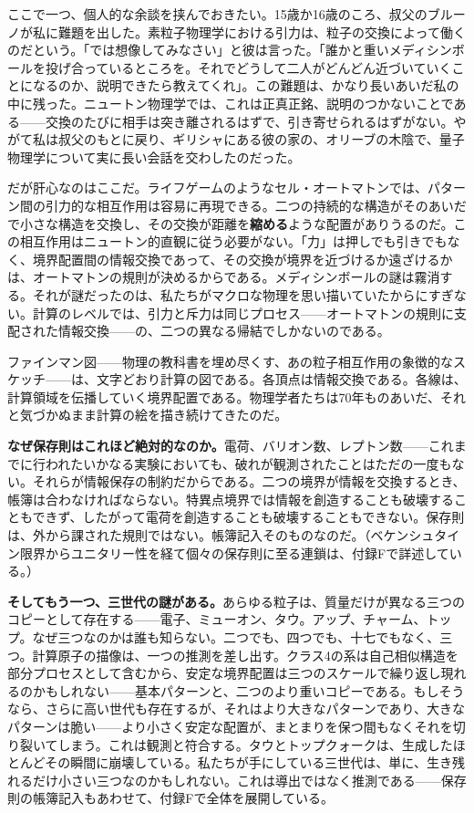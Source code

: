 \documentclass[11pt, twoside, openright]{book}
\begin{document}
ここで一つ、個人的な余談を挟んでおきたい。15歳か16歳のころ、叔父のブルーノが私に難題を出した。素粒子物理学における引力は、粒子の交換によって働くのだという。「では想像してみなさい」と彼は言った。「誰かと重いメディシンボールを投げ合っているところを。それでどうして二人がどんどん近づいていくことになるのか、説明できたら教えてくれ」。この難題は、かなり長いあいだ私の中に残った。ニュートン物理学では、これは正真正銘、説明のつかないことである------交換のたびに相手は突き離されるはずで、引き寄せられるはずがない。やがて私は叔父のもとに戻り、ギリシャにある彼の家の、オリーブの木陰で、量子物理学について実に長い会話を交わしたのだった。

だが肝心なのはここだ。ライフゲームのようなセル・オートマトンでは、パターン間の引力的な相互作用は容易に再現できる。二つの持続的な構造がそのあいだで小さな構造を交換し、その交換が距離を\textbf{縮める}ような配置がありうるのだ。この相互作用はニュートン的直観に従う必要がない。「力」は押しでも引きでもなく、境界配置間の情報交換であって、その交換が境界を近づけるか遠ざけるかは、オートマトンの規則が決めるからである。メディシンボールの謎は霧消する。それが謎だったのは、私たちがマクロな物理を思い描いていたからにすぎない。計算のレベルでは、引力と斥力は同じプロセス------オートマトンの規則に支配された情報交換------の、二つの異なる帰結でしかないのである。

ファインマン図------物理の教科書を埋め尽くす、あの粒子相互作用の象徴的なスケッチ------は、文字どおり計算の図である。各頂点は情報交換である。各線は、計算領域を伝播していく境界配置である。物理学者たちは70年ものあいだ、それと気づかぬまま計算の絵を描き続けてきたのだ。

\textbf{なぜ保存則はこれほど絶対的なのか。}電荷、バリオン数、レプトン数------これまでに行われたいかなる実験においても、破れが観測されたことはただの一度もない。それらが情報保存の制約だからである。二つの境界が情報を交換するとき、帳簿は合わなければならない。特異点境界では情報を創造することも破壊することもできず、したがって電荷を創造することも破壊することもできない。保存則は、外から課された規則ではない。帳簿記入そのものなのだ。（ベケンシュタイン限界からユニタリー性を経て個々の保存則に至る連鎖は、付録Fで詳述している。）

\textbf{そしてもう一つ、三世代の謎がある。}あらゆる粒子は、質量だけが異なる三つのコピーとして存在する------電子、ミューオン、タウ。アップ、チャーム、トップ。なぜ三つなのかは誰も知らない。二つでも、四つでも、十七でもなく、三つ。計算原子の描像は、一つの推測を差し出す。クラス4の系は自己相似構造を部分プロセスとして含むから、安定な境界配置は三つのスケールで繰り返し現れるのかもしれない------基本パターンと、二つのより重いコピーである。もしそうなら、さらに高い世代も存在するが、それはより大きなパターンであり、大きなパターンは脆い------より小さく安定な配置が、まとまりを保つ間もなくそれを切り裂いてしまう。これは観測と符合する。タウとトップクォークは、生成したほとんどその瞬間に崩壊している。私たちが手にしている三世代は、単に、生き残れるだけ小さい三つなのかもしれない。これは導出ではなく推測である------保存則の帳簿記入もあわせて、付録Fで全体を展開している。
\end{document}

